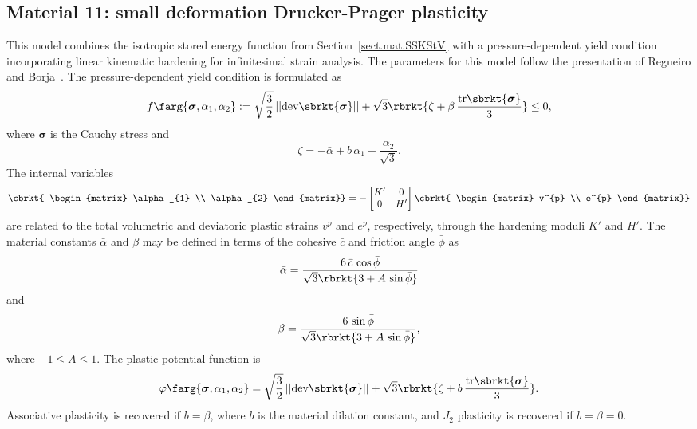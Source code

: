 \subsection{Material 11: small deformation Drucker-Prager plasticity}
\label{sect.mat.SS.DP.LinearHardening}
This model combines the isotropic stored energy function from 
Section~\ref{sect.mat.SSKStV} with
a pressure-dependent yield condition incorporating
linear kinematic
hardening for infinitesimal strain analysis. 
The parameters for this model follow the presentation of
Regueiro and Borja~\cite{Regueiro1999}. 
The pressure-dependent yield condition is formulated as
\begin{equation}
	f\farg{\boldsymbol{\sigma}, \alpha_{1}, \alpha_{2}} := 
	\sqrt{\frac{3}{2}}\,||\textrm{dev}\sbrkt{\boldsymbol{\sigma}}|| 
	+ \sqrt{3} \rbrkt{\zeta + 
	\beta\,\frac{\textrm{tr}\sbrkt{\boldsymbol{\sigma}}}{3}} \le 0,
\end{equation}
where $\boldsymbol{\sigma}$ is the Cauchy stress and
\begin{equation}
\zeta = -\bar{\alpha} + b\,\alpha_{1} + \frac{\alpha_{2}}{\sqrt{3}}.
\end{equation}
The internal variables
\begin{equation}
\cbrkt{
\begin{matrix}
\alpha_{1} \\
\alpha_{2}
\end{matrix}} = -
\begin{bmatrix}
K' & 0 \\
0  & H'
\end{bmatrix}
\cbrkt{
\begin{matrix}
v^{p} \\
e^{p}
\end{matrix}}
\end{equation}
are related to the total volumetric and deviatoric plastic strains
$v^{p}$ and $e^{p}$, respectively, through the hardening moduli
$K'$ and $H'$. The material constants $\bar{\alpha}$ and $\beta$ may 
be defined in terms of the cohesive $\bar{c}$ and friction angle
$\bar{\phi}$ as
\begin{equation}
\bar{\alpha} = \frac{6\,\bar{c}\,\cos{\bar{\phi}}}
                    {\sqrt{3}\rbrkt{3+A\,\sin{\bar{\phi}}}}
\end{equation}
and
\begin{equation}
\beta = \frac{6\,\sin{\bar{\phi}}}
             {\sqrt{3}\rbrkt{3 + A\,\sin{\bar{\phi}}}},	
\end{equation}
where $-1 \le A \le 1$.
The plastic potential function is
\begin{equation}
\varphi\farg{\boldsymbol{\sigma}, \alpha_{1}, \alpha_{2}}=
\sqrt{\frac{3}{2}}\,||\textrm{dev} \sbrkt{\boldsymbol{\sigma}}|| +
\sqrt{3}\rbrkt{\zeta + b\,\frac{\textrm{tr}\sbrkt{\boldsymbol{\sigma}}}{3}}.
\end{equation}
Associative plasticity is recovered if $b=\beta$, where $b$ is the 
material dilation constant, and $J_{2}$ plasticity is recovered if
$b =\beta=0$.

